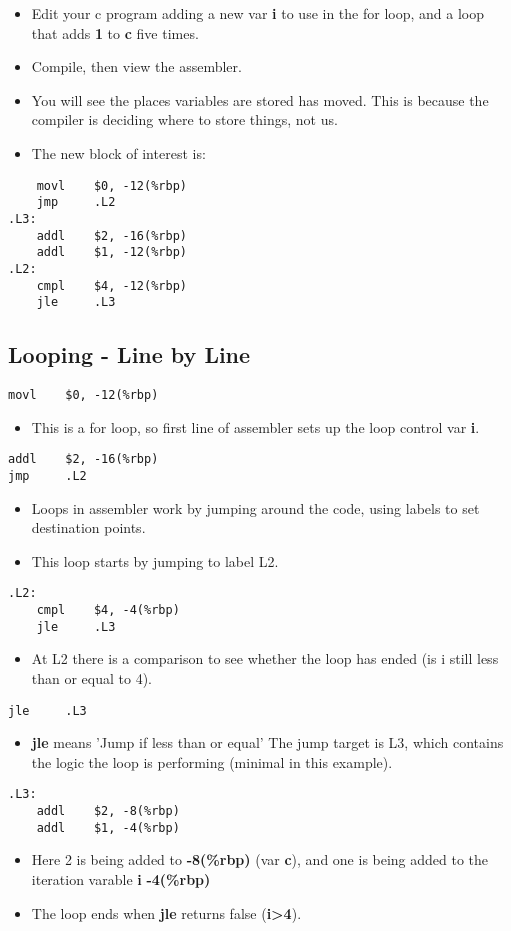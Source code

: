 \documentclass[minimal, t]{article}
\begin{document}
\begin{itemize}
\item Edit your c program adding a new var \textbf{i} to
use in the for loop, and a loop that adds \textbf{1} to \textbf{c} five times.
\item Compile, then view the assembler.
\item You will see the places variables are stored has moved. This is
because the compiler is deciding where to store things, not us.
\item The new block of interest is:
\end{itemize}
\begin{verbatim}
	movl    $0, -12(%rbp)
	jmp     .L2
.L3:
	addl    $2, -16(%rbp)
	addl    $1, -12(%rbp)
.L2:
	cmpl    $4, -12(%rbp)
	jle     .L3
\end{verbatim}
\subsection{Looping - Line by Line}
\label{sec-1-3}
\begin{verbatim}
movl    $0, -12(%rbp)
\end{verbatim}
\begin{itemize}
\item This is a for loop, so first line of assembler sets up the loop control var
\textbf{i}.
\end{itemize}
\begin{verbatim}
addl    $2, -16(%rbp)
jmp     .L2
\end{verbatim}
\begin{itemize}
\item Loops in assembler work by jumping around the code, using labels to
set destination points.
\item This loop starts by jumping to label L2.
\end{itemize}
\begin{verbatim}
.L2:
	cmpl    $4, -4(%rbp)
	jle     .L3
\end{verbatim}
\begin{itemize}
\item At L2 there is a comparison to see whether the loop has ended (is
i still less than or equal to 4).
\end{itemize}
\begin{verbatim}
jle     .L3
\end{verbatim}
\begin{itemize}
\item \textbf{jle} means 'Jump if less than or equal' The jump target is L3,
which contains the logic the loop is performing (minimal in this example).
\end{itemize}
\begin{verbatim}
.L3:
	addl    $2, -8(%rbp)
	addl    $1, -4(%rbp)
\end{verbatim}
\begin{itemize}
\item Here 2 is being added to \textbf{-8(\%rbp)} (var \textbf{c}), and one is being
added to the iteration varable \textbf{i} \textbf{-4(\%rbp)}
\item The loop ends when \textbf{jle} returns false (\textbf{i>4}).
\end{itemize}
\end{document}
